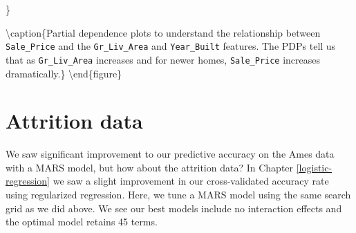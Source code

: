 \documentclass[]{book}
\newenvironment{Shaded}{\begin{snugshade}}{\end{snugshade}}
\newcommand{\CommentTok}[1]{\textcolor[rgb]{0.56,0.35,0.01}{\textit{#1}}}
\newcommand{\DataTypeTok}[1]{\textcolor[rgb]{0.13,0.29,0.53}{#1}}
\newcommand{\DecValTok}[1]{\textcolor[rgb]{0.00,0.00,0.81}{#1}}
\newcommand{\FloatTok}[1]{\textcolor[rgb]{0.00,0.00,0.81}{#1}}
\newcommand{\KeywordTok}[1]{\textcolor[rgb]{0.13,0.29,0.53}{\textbf{#1}}}
\newcommand{\NormalTok}[1]{#1}
\newcommand{\OperatorTok}[1]{\textcolor[rgb]{0.81,0.36,0.00}{\textbf{#1}}}
\newcommand{\OtherTok}[1]{\textcolor[rgb]{0.56,0.35,0.01}{#1}}
\newcommand{\StringTok}[1]{\textcolor[rgb]{0.31,0.60,0.02}{#1}}
\theoremstyle{definition}
\theoremstyle{definition}
\theoremstyle{definition}
\theoremstyle{remark}
\begin{document}
\}

\textbackslash{}caption\{Partial dependence plots to understand the
relationship between \texttt{Sale\_Price} and the \texttt{Gr\_Liv\_Area}
and \texttt{Year\_Built} features. The PDPs tell us that as
\texttt{Gr\_Liv\_Area} increases and for newer homes,
\texttt{Sale\_Price} increases dramatically.\}\label{fig:pdp}
\textbackslash{}end\{figure\}

\hypertarget{attrition-data-1}{%
\section{Attrition data}\label{attrition-data-1}}

We saw significant improvement to our predictive accuracy on the Ames
data with a MARS model, but how about the attrition data? In Chapter
\ref{logistic-regression} we saw a slight improvement in our
cross-validated accuracy rate using regularized regression. Here, we
tune a MARS model using the same search grid as we did above. We see our
best models include no interaction effects and the optimal model retains
45 terms.

\begin{Shaded}
\end{Shaded}
\end{document}
